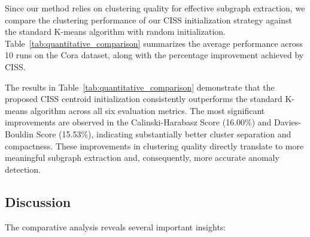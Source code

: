 \documentclass[10pt,twocolumn,a4paper]{article}
\begin{document}
Since our method relies on clustering quality for effective subgraph extraction, we compare the clustering performance of our CISS initialization strategy against the standard K-means algorithm with random initialization. Table~\ref{tab:quantitative_comparison} summarizes the average performance across 10 runs on the Cora dataset, along with the percentage improvement achieved by CISS.

\begin{table}[t]
\centering
\caption{Quantitative Comparison: CISS vs. Original K-means (Avg. over 10 runs on Cora)}
\label{tab:quantitative_comparison}
\small
\setlength{\tabcolsep}{4pt}
\renewcommand{\arraystretch}{1.1}
\end{table}

The results in Table~\ref{tab:quantitative_comparison} demonstrate that the proposed CISS centroid initialization consistently outperforms the standard K-means algorithm across all six evaluation metrics. The most significant improvements are observed in the Calinski-Harabasz Score (16.00\%) and Davies-Bouldin Score (15.53\%), indicating substantially better cluster separation and compactness. These improvements in clustering quality directly translate to more meaningful subgraph extraction and, consequently, more accurate anomaly detection.

\subsection{Discussion}

The comparative analysis reveals several important insights:
\end{document}
